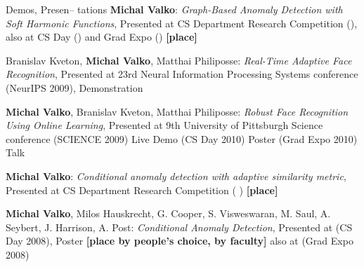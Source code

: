 \documentclass{resume}
\begin{document}
\begin{category}{Demos, Presen-- tations}
\citembullet
{\bf Michal Valko}:  \emph{Graph-Based Anomaly Detection with Soft Harmonic
Functions}, Presented at
CS Department Research Competition  ({}), also at CS Day ({})
and  Grad Expo ({}) {\bf [\first place]}

\citembullet
Branislav Kveton, {\bf  Michal Valko}, Matthai Philiposse:  \emph{Real-Time
Adaptive Face Recognition}, Presented at
23rd Neural Information Processing Systems conference ({\sf NeurIPS 2009}),
Demonstration

\citembullet
{\bf  Michal Valko}, Branislav Kveton, Matthai Philiposse:  \emph{Robust Face
Recognition Using Online Learning}, Presented at
9th University of Pittsburgh Science conference ({\sf SCIENCE 2009}) Live Demo
({\sf CS Day 2010}) Poster ({\sf Grad Expo 2010}) Talk

\citembullet
{\bf Michal Valko}:  \emph{Conditional anomaly detection with adaptive
similarity metric}, Presented at
CS Department Research Competition  ({ }) {\bf [\first place]}

\citembullet
{\bf Michal Valko}, Milos Hauskrecht, G. Cooper, S. Visweswaran, M. Saul, A.
Seybert,  J. Harrison, A. Post:
\emph{Conditional Anomaly Detection}, Presented at ({\sf CS Day 2008}), Poster
 {\bf[\first  place by people's choice, \second by faculty]} also at ({\sf Grad
Expo 2008})
 \end{category}

\end{document}
